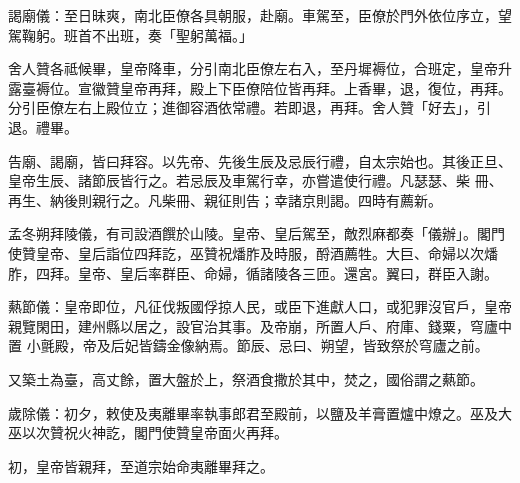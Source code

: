 \begin{pinyinscope}
 謁廟儀：至日昧爽，南北臣僚各具朝服，赴廟。車駕至，臣僚於門外依位序立，望駕鞠躬。班首不出班，奏「聖躬萬福。」



 舍人贊各祗候畢，皇帝降車，分引南北臣僚左右入，至丹墀褥位，合班定，皇帝升露臺褥位。宣徽贊皇帝再拜，殿上下臣僚陪位皆再拜。上香畢，退，復位，再拜。分引臣僚左右上殿位立；進御容酒依常禮。若即退，再拜。舍人贊「好去」，引退。禮畢。



 告廟、謁廟，皆曰拜容。以先帝、先後生辰及忌辰行禮，自太宗始也。其後正旦、皇帝生辰、諸節辰皆行之。若忌辰及車駕行幸，亦嘗遣使行禮。凡瑟瑟、柴
 冊、再生、納後則親行之。凡柴冊、親征則告；幸諸京則謁。四時有薦新。



 孟冬朔拜陵儀，有司設酒饌於山陵。皇帝、皇后駕至，敵烈麻都奏「儀辦」。閣門使贊皇帝、皇后詣位四拜訖，巫贊祝燔胙及時服，酹酒薦牲。大巨、命婦以次燔胙，四拜。皇帝、皇后率群臣、命婦，循諸陵各三匝。還宮。翼曰，群臣入謝。



 爇節儀：皇帝即位，凡征伐叛國俘掠人民，或臣下進獻人口，或犯罪沒官戶，皇帝親覽閑田，建州縣以居之，設官治其事。及帝崩，所置人戶、府庫、錢粟，穹廬中置
 小氈殿，帝及后妃皆鑄金像納焉。節辰、忌曰、朔望，皆致祭於穹廬之前。



 又築土為臺，高丈餘，置大盤於上，祭酒食撒於其中，焚之，國俗謂之爇節。



 歲除儀：初夕，敕使及夷離畢率執事郎君至殿前，以鹽及羊膏置爐中燎之。巫及大巫以次贊祝火神訖，閣門使贊皇帝面火再拜。



 初，皇帝皆親拜，至道宗始命夷離畢拜之。



\end{pinyinscope}